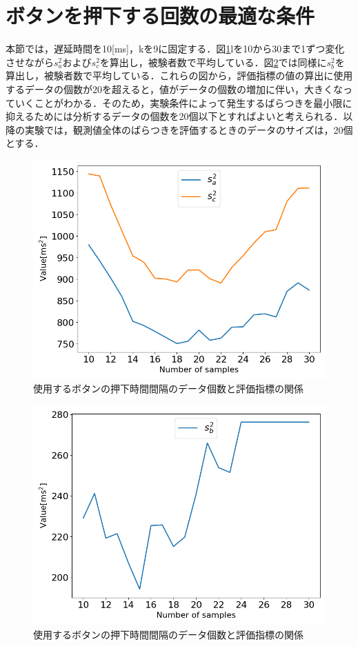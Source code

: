 \section{ボタンを押下する回数の最適な条件}
本節では，遅延時間を10[ms]，kを9に固定する．図\ref{fig:NumberofSamples_Sa_Sc}lを10から30まで1ずつ変化させながら$s^2_{a}$および$s^2_{c}$を算出し，被験者数で平均している．図\ref{fig:Numberofsamples_Sb}では同様に$s^2_{b}$を算出し，被験者数で平均している．これらの図から，評価指標の値の算出に使用するデータの個数が20を超えると，値がデータの個数の増加に伴い，大きくなっていくことがわかる．そのため，実験条件によって発生するばらつきを最小限に抑えるためには分析するデータの個数を20個以下とすればよいと考えられる．以降の実験では，観測値全体のばらつきを評価するときのデータのサイズは，20個とする．
\begin{figure}[bt]
  \centering
  \includegraphics[scale=0.6]{figures/Yobi/NumberOfSamples_s1s3.png}
  \caption{使用するボタンの押下時間間隔のデータ個数と評価指標の関係}
  \label{fig:NumberofSamples_Sa_Sc}
\end{figure}
\begin{figure}[bt]
  \centering
  \includegraphics[scale=0.6]{figures/Yobi/NumberOfSamples_median.png}
  \caption{使用するボタンの押下時間間隔のデータ個数と評価指標の関係}
  \label{fig:Numberofsamples_Sb}
\end{figure}

